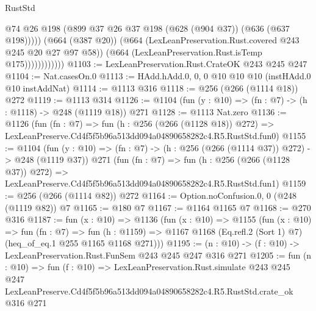 \begin{lexlean}{RustStd}
\begin{coremodule}
                            @74
                            @26
                            @198
                            (@899 @37 @26 @37 @198 (@628 (@904 @37)) (@636 (@637 @198)))))
                        (@664 (@387 @20))
                        (@664 (LexLeanPreservation.Rust.covered @243 @245 @20 @27 @97 @58))
                        (@664 (LexLeanPreservation.Rust.isTemp @175))))))))))))
@1103 := LexLeanPreservation.Rust.CrateOK @243 @245 @247
@1104 := Nat.casesOn.{0}
@1113 := HAdd.hAdd.{0, 0, 0} @10 @10 @10 (instHAdd.{0} @10 instAddNat)
@1114 := @1113 @316
@1118 := @256 (@266 (@1114 @18)) @272
@1119 := @1113 @314
@1126 := @1104 (fun (y : @10) => (fn : @7) -> (h : @1118) -> @248 (@1119 @18)) @271
@1128 := @1113 Nat.zero
@1136 := @1126
    (fun (fn : @7) =>
    fun (h : @256 (@266 (@1128 @18)) @272) =>
    LexLeanPreserve.Cd4f5f5b96a513dd094a04890658282c4.R5.RustStd.fun0)
@1155 := @1104
    (fun (y : @10) => (fn : @7) -> (h : @256 (@266 (@1114 @37)) @272) -> @248 (@1119 @37))
    @271
    (fun (fn : @7) =>
    fun (h : @256 (@266 (@1128 @37)) @272) =>
    LexLeanPreserve.Cd4f5f5b96a513dd094a04890658282c4.R5.RustStd.fun1)
@1159 := @256 (@266 (@1114 @82)) @272
@1164 := Option.noConfusion.{0, 0} (@248 (@1119 @82)) @7
@1165 := @180 @7
@1167 := @1164 @1165 @7
@1168 := @270 @316
@1187 := fun (x : @10) =>
  @1136
    (fun (x : @10) =>
    @1155
      (fun (x : @10) =>
      fun (fn : @7) =>
      fun (h : @1159) =>
      @1167 @1168 (Eq.refl.{2} (Sort 1) @7) (heq_of_eq.{1} @255 @1165 @1168 @271)))
@1195 := (n : @10) -> (f : @10) -> LexLeanPreservation.Rust.FunSem @243 @245 @247 @316 @271
@1205 := fun (n : @10) =>
  fun (f : @10) =>
  LexLeanPreservation.Rust.simulate
    @243
    @245
    @247
    LexLeanPreserve.Cd4f5f5b96a513dd094a04890658282c4.R5.RustStd.crate_ok
    @316
    @271
\end{coremodule}
\end{lexlean}
